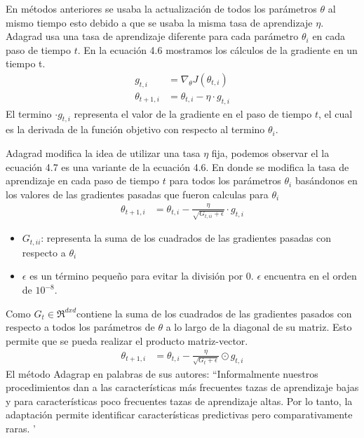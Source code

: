 En métodos anteriores se usaba la actualización de todos los parámetros $\theta$ al mismo tiempo esto debido a que se usaba la misma tasa de aprendizaje $\eta $. Adagrad usa una tasa de aprendizaje diferente para cada parámetro $\theta_{i}$ en cada paso de tiempo $t$.
En la ecuación 4.6 mostramos los cálculos de la gradiente en un tiempo t.
\begin{equation}
\label{adagrad1}
\begin{aligned}
g_{t,i}&=\nabla_{\theta} J(\theta_{t,i})\\
\theta_{t+1,i} &= \theta_{t,i} -\eta \cdot g_{t,i}
\end{aligned}
\end{equation}
El termino $\cdot g_{t,i}$ representa el valor de la gradiente en el paso de tiempo $t$, el cual es la derivada de la función objetivo con respecto al termino $\theta_{i}$.

Adagrad modifica la idea de utilizar una tasa $\eta$ fija, podemos observar el la ecuación 4.7 es una variante de la ecuación 4.6. En donde se modifica la tasa de aprendizaje en cada paso de tiempo $t$ para todos los parámetros $\theta_{i} $ basándonos en los valores de las gradientes pasadas que fueron calculas para $\theta_{i}$
\begin{equation}
\label{adagrad2}
\begin{aligned}
\theta_{t+1,i} &= \theta_{t,i} - \frac{\eta}{\sqrt{G_{t,ii}+\epsilon}} \cdot g_{t,i}
\end{aligned}
\end{equation}

\begin{itemize}
	\item $G_{t,ii}$: representa la suma de los cuadrados de las gradientes pasadas con respecto a $\theta_{i}$
	\item $\epsilon $ es un término pequeño para evitar la división por 0. $\epsilon$ encuentra en el orden de $10^{-8}$.
\end{itemize}
Como $G_{t} \in \Re^{dxd} $contiene la suma de los cuadrados de las gradientes pasados con respecto a todos los parámetros de $\theta$ a lo largo de la diagonal de su matriz. Esto permite que se pueda realizar el producto matriz-vector.
\begin{equation}
\label{adagrad3}
\begin{aligned}
\theta_{t+1,i} &= \theta_{t,i} - \frac{\eta}{\sqrt{G_{t}+\epsilon}} \odot g_{t,i}
\end{aligned}
\end{equation}
El método Adagrap en palabras de sus autores:
\textquotedblleft Informalmente nuestros procedimientos dan a las características más frecuentes tazas de aprendizaje bajas y para características poco frecuentes tazas de aprendizaje altas. Por lo tanto, la adaptación permite identificar características predictivas pero comparativamente raras. \textquoteright  \cite{ADA} 

